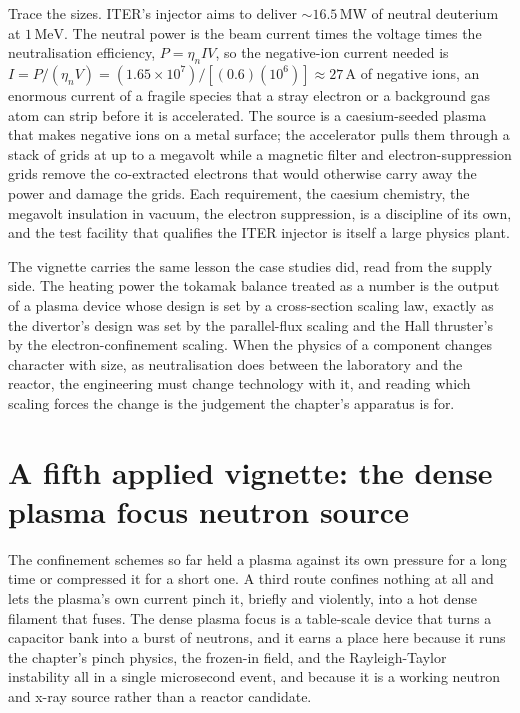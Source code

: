 Trace the sizes. ITER's injector aims to deliver $\sim 16.5\,\si{\mega\watt}$ of
neutral deuterium at $1\,\si{\mega\electronvolt}$. The neutral power is the beam
current times the voltage times the neutralisation efficiency, $P = \eta_n I V$,
so the negative-ion current needed is $I = P/(\eta_n V) = (1.65\times 10^{7})/
[(0.6)(10^{6})] \approx 27\,\si{\ampere}$ of negative ions, an enormous
current of a fragile species that a stray electron or a background gas atom can
strip before it is accelerated. The source is a caesium-seeded plasma that makes
negative ions on a metal surface; the accelerator pulls them through a stack of
grids at up to a megavolt while a magnetic filter and electron-suppression grids
remove the co-extracted electrons that would otherwise carry away the power and
damage the grids. Each requirement, the caesium chemistry, the megavolt
insulation in vacuum, the electron suppression, is a discipline of its own, and
the test facility that qualifies the ITER injector is itself a large physics
plant.

The vignette carries the same lesson the case studies did, read from the supply
side. The heating power the tokamak balance treated as a number is the output of
a plasma device whose design is set by a cross-section scaling law, exactly as
the divertor's design was set by the parallel-flux scaling and the Hall
thruster's by the electron-confinement scaling. When the physics of a component
changes character with size, as neutralisation does between the laboratory and
the reactor, the engineering must change technology with it, and reading which
scaling forces the change is the judgement the chapter's apparatus is for.

\section{A fifth applied vignette: the dense plasma focus neutron source}

The confinement schemes so far held a plasma against its own pressure for a
long time or compressed it for a short one. A third route confines nothing at
all and lets the plasma's own current pinch it, briefly and violently, into a
hot dense filament that fuses. The dense plasma focus is a table-scale device
that turns a capacitor bank into a burst of neutrons, and it earns a place here
because it runs the chapter's pinch physics, the frozen-in field, and the
Rayleigh-Taylor instability all in a single microsecond event, and because it
is a working neutron and x-ray source rather than a reactor candidate.

